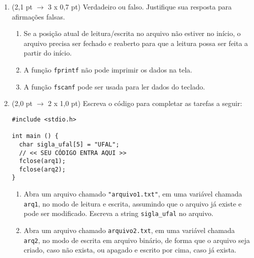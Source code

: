 \documentclass[a4paper,10pt]{article}
\begin{document}
\begin{multicols*}{2}
\begin{enumerate}
  \item (2,1 pt $\rightarrow$ 3 x 0,7 pt) Verdadeiro ou falso. Justifique sua resposta para afirmações falsas.

  \begin{enumerate}
    \item Se a posição atual de leitura/escrita no arquivo não estiver no início, o arquivo precisa ser fechado e reaberto para que a leitura possa ser feita a partir do início. %
    \item A função \texttt{fprintf} não pode imprimir os dados na tela. %
    \item A função \texttt{fscanf} pode ser usada para ler dados do teclado. %
  \end{enumerate}

  \item (2,0 pt $\rightarrow$ 2 x 1,0 pt) Escreva o código para completar as tarefas a seguir:

  \begin{verbatim}
#include <stdio.h>

int main () {
  char sigla_ufal[5] = "UFAL";
  // << SEU CÓDIGO ENTRA AQUI >>
  fclose(arq1);
  fclose(arq2);
}
  \end{verbatim}

  \begin{enumerate}
    \item Abra um arquivo chamado \texttt{"arquivo1.txt"}, em uma variável chamada \texttt{arq1}, no modo de leitura e escrita, assumindo que o arquivo já existe e pode ser modificado. Escreva a string \texttt{sigla\_ufal} no arquivo.
    \item Abra um arquivo chamado \texttt{arquivo2.txt}, em uma variável chamada \texttt{arq2}, no modo de escrita em arquivo binário, de forma que o arquivo seja criado, caso não exista, ou apagado e escrito por cima, caso já exista.
  \end{enumerate}


\end{enumerate}
\end{multicols*}
\end{document}
